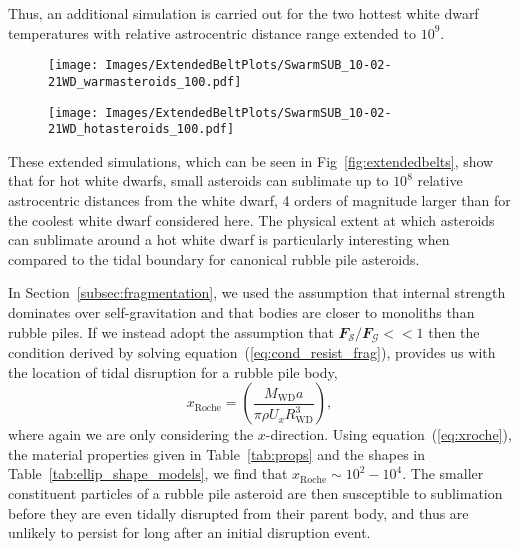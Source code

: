 \documentclass[fleqn,usenatbib]{mnras}
\begin{document}
Thus, an additional simulation is carried out for the two hottest white dwarf temperatures with relative astrocentric distance range extended to $10^9$.
\begin{figure*}
    \begin{subfigure}[c]{.5\linewidth}
        \centering
        \texttt{[image: Images/ExtendedBeltPlots/SwarmSUB\_10-02-21WD\_warmasteroids\_100.pdf]}
        \label{subfig:warmWD_extended}
    \end{subfigure}%
    \begin{subfigure}[c]{.5\linewidth}
        \centering
        \texttt{[image: Images/ExtendedBeltPlots/SwarmSUB\_10-02-21WD\_hotasteroids\_100.pdf]}
        \label{subfig:hotWD_extended}
    \end{subfigure}
    \caption{The fate of sublimated Main belt analogue asteroids approaching a white dwarf on an extremely eccentric orbit.
    Here as in Fig.~\ref{fig:belts}, the line colours and line styles indicate the shape model, the marker fill shows the material properties of the specific body. 
    Only sublimated asteroids are shown in these panels, and hence all end points have the same cross-shaped marker.
    The $x$-axis showing the relative astrocentric distance from the white dwarf is extended to $10^9$, as compared to $10^4$ in Fig.~\ref{fig:belts}.
    The hottest white dwarfs considered in this work can completely sublimate small asteroids up to $\sim 10^8$ relative astrocentric distances away from the central star, seven orders of magnitude further out than for the coolest white dwarf considered in this work.}
    \label{fig:extendedbelts}
\end{figure*}
These extended simulations, which can be seen in Fig~\ref{fig:extendedbelts}, show that for hot white dwarfs, small asteroids can sublimate up to $10^8$ relative astrocentric distances from the white dwarf, 4 orders of magnitude larger than for the coolest white dwarf considered here. 
The physical extent at which asteroids can sublimate around a hot white dwarf is particularly interesting when compared to the tidal boundary for canonical rubble pile asteroids. 

In Section~\ref{subsec:fragmentation}, we used the assumption that internal strength dominates over self-gravitation and that bodies are closer to monoliths than rubble piles. 
If we instead adopt the assumption that $\mathcal{\mathbfit{F}_S}/\mathcal{\mathbfit{F}_G}<<1$ then the condition derived by solving equation~(\ref{eq:cond_resist_frag}), provides us with the location of tidal disruption for a rubble pile body,
\begin{equation}
    x_\text{Roche} = \left( \frac{M_\text{WD} a}{\pi \rho U_x R_\text{WD}^3} \right),
    \label{eq:xroche}
\end{equation}
where again we are only considering the $x$-direction.
Using equation~(\ref{eq:xroche}), the material properties given in Table~\ref{tab:props} and the shapes in Table~\ref{tab:ellip_shape_models}, we find that $x_\text{Roche} \sim 10^2-10^4$.
The smaller constituent particles of a rubble pile asteroid are then susceptible to sublimation before they are even tidally disrupted from their parent body, and thus are unlikely to persist for long after an initial disruption event.
\end{document}
